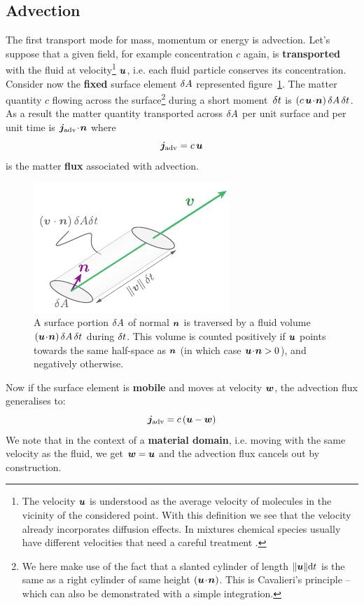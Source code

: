 \subsection{Advection}
\label{sec:advection}
The first transport mode for mass, momentum or energy is advection.
Let's suppose that a given field, for example concentration $c$ again, is \textbf{transported} with the fluid at velocity\footnote{The velocity $\bu$ is understood as the average velocity of molecules in the vicinity of the considered point. With this definition we see that the velocity already incorporates  diffusion effects. In mixtures chemical species usually have different velocities that need a careful treatment \citep[][\S17.7]{Bird2002}.} $\bu$, i.e. each fluid particle conserves its concentration. Consider now the \textbf{fixed} surface element $\delta A$ represented figure~\ref{fig:slanted_cylinder}. The matter quantity $c$ flowing across the surface\footnote{We here make use of the fact that a slanted cylinder of length $\|\bu\| \mathrm dt$ is the same as a right cylinder of same height $\lp\bu\!\cdot\!\bn\rp$. This is Cavalieri's principle -- which can also be demonstrated with a simple integration.} during a short moment~$\delta t$ is $\lp c \,\bu \!\cdot\! \bn\rp \delA \,\delt$. 
As a result the matter quantity transported across $\delta A$ per unit surface and per unit time is $\bj_\text{adv} \!\cdot\! \bn$ where 
\begin{equation}
\bj_\text{adv} = c\, \bu
\end{equation}
is the matter \textbf{flux} associated with advection.  
\begin{figure}[htbp]
\begin{center}
\includegraphics{./pics/slanted_cylinder.pdf}
\caption{A surface portion $\delta A$ of normal $\bn$ is traversed by a fluid volume $\lp\bu \!\cdot\!\bn\rp\delA\,\delt$ during $\delta t$. This volume is counted positively if  $\bu$ points towards the same half-space as $\bn$ (in which case $\bu \!\cdot\! \bn > 0$), and negatively otherwise.}
\label{fig:slanted_cylinder}
\end{center}
\end{figure}
Now if the surface element is \textbf{mobile} and moves at velocity $\bw$, the advection flux generalises to: 
 \begin{equation}
\bj_\text{adv} = c\, (\bu-\bw)
\end{equation}
We note that in the context of a \textbf{material domain}, i.e. moving with the same velocity as the fluid, we get $\bw = \bu$ and the advection flux cancels out by construction.
